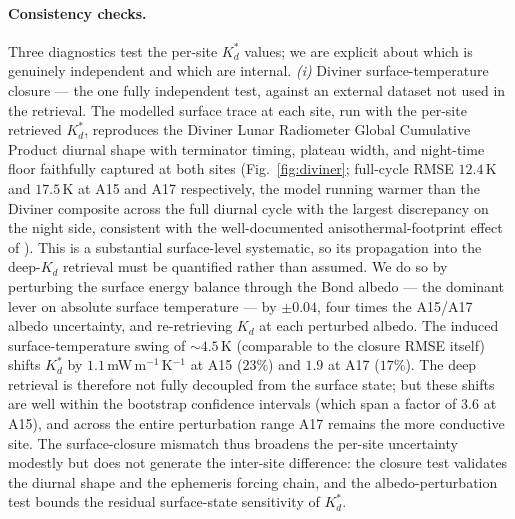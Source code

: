 \documentclass[11pt]{article}
\begin{document}
\paragraph*{Consistency checks.}
Three diagnostics test the per-site $K_d^{*}$ values; we are explicit
about which is genuinely independent and which are internal. \emph{(i)}
Diviner surface-temperature closure --- the one fully independent
test, against an external dataset not used in the retrieval. The
modelled surface trace at
each site, run with the per-site retrieved $K_d^{*}$, reproduces
the Diviner Lunar Radiometer Global Cumulative Product
\citep{williams2017diviner} diurnal shape with terminator timing,
plateau width, and night-time floor faithfully captured at both
sites (Fig.~\ref{fig:diviner};
full-cycle RMSE $12.4$\,K and
$17.5$\,K at A15 and A17 respectively, the model running warmer than the Diviner composite across the full diurnal cycle with the largest discrepancy on the night side, consistent with the well-documented anisothermal-footprint
effect of \citet{bandfield2015,hayne2017}). This is a substantial
surface-level systematic, so its propagation into the deep-$K_d$
retrieval must be quantified rather than assumed. We do so by
perturbing the surface energy balance through the Bond albedo --- the
dominant lever on absolute surface temperature --- by $\pm0.04$, four
times the A15/A17 albedo uncertainty, and re-retrieving $K_d$ at each
perturbed albedo. The induced surface-temperature swing of
$\sim\!4.5$\,K (comparable to the closure RMSE itself) shifts
$K_{d}^{*}$ by $1.1$\,mW\,m$^{-1}$\,K$^{-1}$ at A15 ($23\%$) and
$1.9$ at A17 ($17\%$). The deep retrieval is therefore not
fully decoupled from the surface state; but these shifts are well
within the bootstrap confidence intervals (which span a factor of
$3.6$ at A15), and across the entire perturbation range A17 remains
the more conductive site. The surface-closure mismatch thus broadens
the per-site uncertainty modestly but does not generate the inter-site
difference: the closure test validates the diurnal shape and
the ephemeris forcing chain, and the albedo-perturbation test bounds
the residual surface-state sensitivity of $K_d^{*}$.
\end{document}
